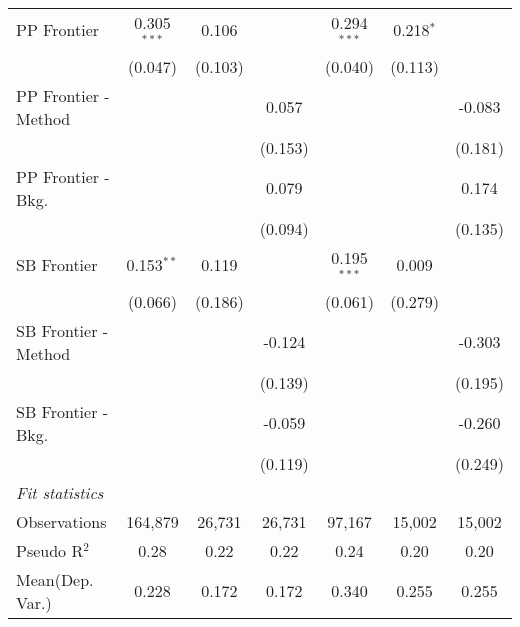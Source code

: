 \begin{tabular}{lcccccc}
   PP Frontier          & 0.305$^{***}$ & 0.106         &               & 0.294$^{***}$ & 0.218$^{*}$   &   \\   
                        & (0.047)       & (0.103)       &               & (0.040)       & (0.113)       &   \\   
   PP Frontier - Method &               &               & 0.057         &               &               & -0.083\\   
                        &               &               & (0.153)       &               &               & (0.181)\\   
   PP Frontier - Bkg.   &               &               & 0.079         &               &               & 0.174\\   
                        &               &               & (0.094)       &               &               & (0.135)\\   
   SB Frontier          & 0.153$^{**}$  & 0.119         &               & 0.195$^{***}$ & 0.009         &   \\   
                        & (0.066)       & (0.186)       &               & (0.061)       & (0.279)       &   \\   
   SB Frontier - Method &               &               & -0.124        &               &               & -0.303\\   
                        &               &               & (0.139)       &               &               & (0.195)\\   
   SB Frontier - Bkg.   &               &               & -0.059        &               &               & -0.260\\   
                        &               &               & (0.119)       &               &               & (0.249)\\   
   \midrule
   \emph{Fit statistics}\\
   Observations         & 164,879       & 26,731        & 26,731        & 97,167        & 15,002        & 15,002\\  
   Pseudo R$^2$         & 0.28          & 0.22          & 0.22          & 0.24          & 0.20          & 0.20\\  
Mean(Dep. Var.) & 0.228 & 0.172 & 0.172 & 0.340 & 0.255 & 0.255 \\
   

\end{tabular}
